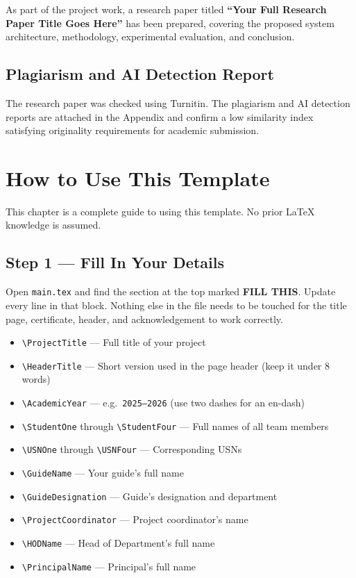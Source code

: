 \documentclass[12pt,a4paper]{report}
\begin{document}
As part of the project work, a research paper titled
\textbf{``Your Full Research Paper Title Goes Here''}
has been prepared, covering the proposed system architecture, methodology,
experimental evaluation, and conclusion.

\section{Plagiarism and AI Detection Report}

The research paper was checked using Turnitin. The plagiarism and AI detection
reports are attached in the Appendix and confirm a low similarity index
satisfying originality requirements for academic submission.

\chapter{How to Use This Template}

This chapter is a complete guide to using this template. No prior LaTeX knowledge is assumed.

\section{Step 1 — Fill In Your Details}

Open \texttt{main.tex} and find the section at the top marked \textbf{FILL THIS}. Update every line in that block. Nothing else in the file needs to be touched for the title page, certificate, header, and acknowledgement to work correctly.

\begin{itemize}
    \item \texttt{\textbackslash ProjectTitle} --- Full title of your project
    \item \texttt{\textbackslash HeaderTitle} --- Short version used in the page header (keep it under 8 words)
    \item \texttt{\textbackslash AcademicYear} --- e.g.\ \texttt{2025--2026} (use two dashes for an en-dash)
    \item \texttt{\textbackslash StudentOne} through \texttt{\textbackslash StudentFour} --- Full names of all team members
    \item \texttt{\textbackslash USNOne} through \texttt{\textbackslash USNFour} --- Corresponding USNs
    \item \texttt{\textbackslash GuideName} --- Your guide's full name
    \item \texttt{\textbackslash GuideDesignation} --- Guide's designation and department
    \item \texttt{\textbackslash ProjectCoordinator} --- Project coordinator's name
    \item \texttt{\textbackslash HODName} --- Head of Department's full name
    \item \texttt{\textbackslash PrincipalName} --- Principal's full name
\end{itemize}
\end{document}
